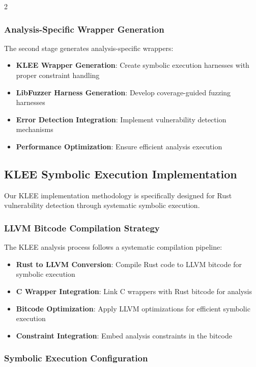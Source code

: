 \documentclass[12pt,a4paper]{article}
\begin{document}
\begin{multicols}{2}
\subsubsection{Analysis-Specific Wrapper Generation}

The second stage generates analysis-specific wrappers:

\begin{itemize}
    \item \textbf{KLEE Wrapper Generation}: Create symbolic execution harnesses with proper constraint handling
    \item \textbf{LibFuzzer Harness Generation}: Develop coverage-guided fuzzing harnesses
    \item \textbf{Error Detection Integration}: Implement vulnerability detection mechanisms
    \item \textbf{Performance Optimization}: Ensure efficient analysis execution
\end{itemize}

\subsection{KLEE Symbolic Execution Implementation}

Our KLEE implementation methodology is specifically designed for Rust vulnerability detection through systematic symbolic execution.

\subsubsection{LLVM Bitcode Compilation Strategy}

The KLEE analysis process follows a systematic compilation pipeline:

\begin{itemize}
    \item \textbf{Rust to LLVM Conversion}: Compile Rust code to LLVM bitcode for symbolic execution
    \item \textbf{C Wrapper Integration}: Link C wrappers with Rust bitcode for analysis
    \item \textbf{Bitcode Optimization}: Apply LLVM optimizations for efficient symbolic execution
    \item \textbf{Constraint Integration}: Embed analysis constraints in the bitcode
\end{itemize}

\subsubsection{Symbolic Execution Configuration}


\end{multicols}
\end{document}
